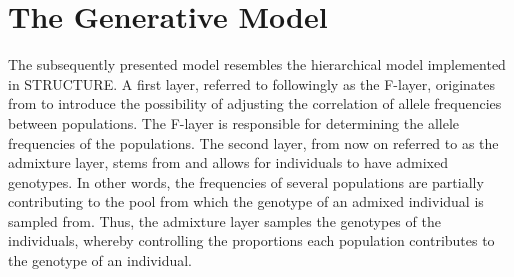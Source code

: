 \documentclass[a4paper, 11pt]{article}
\begin{document}












\section{The Generative Model}
The subsequently presented model resembles the hierarchical model implemented in STRUCTURE. A first layer, referred to followingly as the F-layer, originates from \cite{falush2003inference} to introduce the possibility of adjusting the correlation of allele frequencies between populations. The F-layer is responsible for determining the allele frequencies of the populations. The second layer, from now on referred to as the admixture layer, stems from \cite{pritchard2000inference} and allows for individuals to have admixed genotypes. In other words, the frequencies of several populations are partially contributing to the pool from which the genotype of an admixed individual is sampled from. Thus, the admixture layer samples the genotypes of the individuals, whereby controlling the proportions each population contributes to the genotype of an individual.
\end{document}
